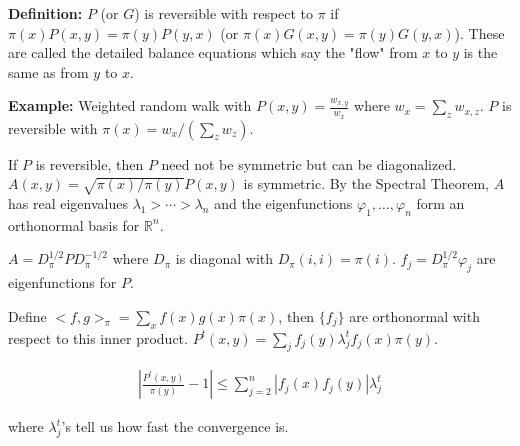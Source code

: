 \documentclass[../../../Master/AppliedStochastics.tex]{subfiles}
\newcommand{\ld}{\lambda}
\newcommand{\ph}{\varphi}
\newcommand{\R}{{\mathbb{R}}}
\begin{document}
\vspace{5mm}
\textbf{Definition:} $P$ (or $G$) is reversible with respect to $\pi$ if $\pi(x)P(x,y)=\pi(y)P(y,x)$ (or $\pi(x)G(x,y)=\pi(y)G(y,x)$). These are called the detailed balance equations which say the "flow" from $x$ to $y$ is the same as from $y$ to $x$. 

\vspace{5mm}
\textbf{Example:} Weighted random walk with $P(x,y)=\frac{w_{x,y}}{w_x}$ where $w_x=\sum_zw_{x,z}$. $P$ is reversible with $\pi(x)=w_x/\left(\sum_zw_z\right)$.

\vspace{5mm}
If $P$ is reversible, then $P$ need not be symmetric but can be diagonalized. $A(x,y)=\sqrt{\pi(x)/\pi(y)}P(x,y)$ is symmetric. By the Spectral Theorem, $A$ has real eigenvalues $\ld_1>\cdots>\ld_n$ and the eigenfunctions $\ph_1,\ldots,\ph_n$ form an orthonormal basis for $\R^n$.

\vspace{5mm}
$A=D_\pi^{1/2}PD_\pi^{-1/2}$ where $D_\pi$ is diagonal with $D_\pi(i,i)=\pi(i)$. $f_j=D_\pi^{1/2}\ph_j$ are eigenfunctions for $P$.

\vspace{5mm}
Define $<f,g>_\pi=\sum_xf(x)g(x)\pi(x)$, then $\{f_j\}$ are orthonormal with respect to this inner product. $P^t(x,y)=\sum_jf_j(y)\ld_j^tf_j(x)\pi(y)$.

$$\begin{aligned}
\left|\frac{P^t(x,y)}{\pi(y)}-1\right|\leq \sum_{j=2}^n|f_j(x)f_j(y)|\ld_j^t
\end{aligned}$$

where $\ld_j^t$'s tell us how fast the convergence is. 
\end{document}
